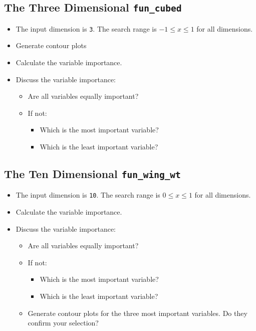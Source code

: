 \documentclass[
  letterpaper,
  DIV=11,
  numbers=noendperiod]{scrreprt}
\providecommand{\tightlist}{%
  \setlength{\itemsep}{0pt}\setlength{\parskip}{0pt}}\usepackage{longtable,booktabs,array}
\begin{document}
\hypertarget{the-three-dimensional-fun_cubed}{%
\subsection{\texorpdfstring{The Three Dimensional
\texttt{fun\_cubed}}{The Three Dimensional fun\_cubed}}\label{the-three-dimensional-fun_cubed}}

\begin{itemize}
\tightlist
\item
  The input dimension is \texttt{3}. The search range is
  \(-1 \leq x \leq 1\) for all dimensions.
\item
  Generate contour plots
\item
  Calculate the variable importance.
\item
  Discuss the variable importance:

  \begin{itemize}
  \tightlist
  \item
    Are all variables equally important?
  \item
    If not:

    \begin{itemize}
    \tightlist
    \item
      Which is the most important variable?
    \item
      Which is the least important variable?
    \end{itemize}
  \end{itemize}
\end{itemize}

\hypertarget{the-ten-dimensional-fun_wing_wt}{%
\subsection{\texorpdfstring{The Ten Dimensional
\texttt{fun\_wing\_wt}}{The Ten Dimensional fun\_wing\_wt}}\label{the-ten-dimensional-fun_wing_wt}}

\begin{itemize}
\tightlist
\item
  The input dimension is \texttt{10}. The search range is
  \(0 \leq x \leq 1\) for all dimensions.
\item
  Calculate the variable importance.
\item
  Discuss the variable importance:

  \begin{itemize}
  \tightlist
  \item
    Are all variables equally important?
  \item
    If not:

    \begin{itemize}
    \tightlist
    \item
      Which is the most important variable?
    \item
      Which is the least important variable?
    \end{itemize}
  \item
    Generate contour plots for the three most important variables. Do
    they confirm your selection?
  \end{itemize}
\end{itemize}
\end{document}
